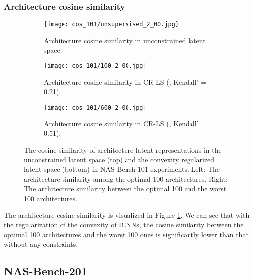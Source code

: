 \documentclass[10pt,twocolumn,letterpaper]{article}
\begin{document}
\subsubsection{Architecture cosine similarity}
\begin{figure}
	\centering
	\begin{subfigure}{1.05 \linewidth}
		\texttt{[image: cos\_101/unsupervised\_2\_00.jpg]}
		\caption{Architecture cosine similarity in unconstrained latent space.}
	\end{subfigure}
	\hfill
	\begin{subfigure}{1.05 \linewidth}
		\texttt{[image: cos\_101/100\_2\_00.jpg]}
		\caption{Architecture cosine similarity in CR-LS (, Kendall'  = 0.21).}
	\end{subfigure}
	\begin{subfigure}{1.05 \linewidth}
		\texttt{[image: cos\_101/600\_2\_00.jpg]}
		\caption{Architecture cosine similarity in CR-LS (, Kendall'  = 0.51).}
	\end{subfigure}
	\caption{The cosine similarity of architecture latent representations in the unconstrained latent space (top) and the convexity regularized latent space (bottom) in NAS-Bench-101 experiments. Left: The architecture similarity among the optimal 100 architectures. Right: The architecture similarity between the optimal 100 and the worst 100 architectures. }
	\label{fig:cos_101}
\end{figure} 
The architecture cosine similarity is visualized in Figure \ref{fig:cos_101}. We can see that with the regularization of the convexity of ICNNs, the cosine similarity between the optimal 100 architectures and the worst 100 ones is significantly lower than that without any constraints.   
\subsection{NAS-Bench-201} 
\end{document}

